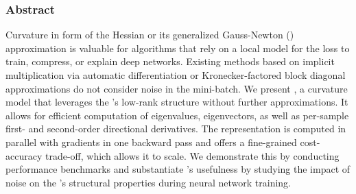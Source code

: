 \subsubsection{Abstract}

Curvature in form of the Hessian or its generalized Gauss-Newton (\ggn)
approximation is valuable for algorithms that rely on a local model for the loss
to train, compress, or explain deep networks.
Existing methods based on implicit multiplication via automatic differentiation
or Kronecker-factored block diagonal approximations do not consider noise in the
mini-batch.
We present \vivit, a curvature model that leverages the \ggn's low-rank
structure without further approximations. It allows for efficient computation of
eigenvalues, eigenvectors, as well as per-sample first- and second-order
directional derivatives.
The representation is computed in parallel with gradients in one backward pass
and offers a fine-grained cost-accuracy trade-off, which allows it to scale.
We demonstrate this by conducting performance benchmarks and substantiate
\vivit's usefulness by studying the impact of noise on the \ggn's structural
properties during neural network training.


